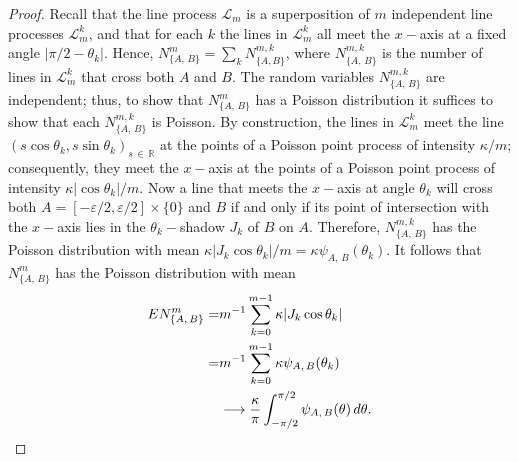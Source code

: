 \documentclass[10pt]{amsart}
\theoremstyle{definition}\newtheorem{defi}[theo]{Definition}\newtheorem{rema}[theo]{Remark}\newtheorem{exam}[theo]{Example}\newtheorem{exem}[theo]{Example}\newtheorem{nota}[theo]{Notation}
\newcommand{\zz}[1]{\mathbb #1}
\begin{document}
\begin{proof}
Recall that the line process $\mathcal{L}_{m}$ is a superposition of $m$ independent line processes $\mathcal{L}^{k}_{m}$, and that for each $k$ the lines in $\mathcal{L}^{k}_{m}$ all meet the $x-$axis at a fixed angle $|\pi /2-\theta_{k}|$. Hence, $N^{m}_{\{A,\,B\}}=\sum_{k}N^{m,k}_{\{A,B\}}$, where $N^{m,k}_{\{A,\,B\}}$ is the number of lines in $\mathcal{L}^{k}_{m}$ that cross both $A$ and $B$. The random variables $N^{m,k}_{\{A,\,B\}}$ are independent; thus, to show that $N^{m}_{\{A,\,B\}}$ has a Poisson distribution it suffices to show that each $N^{m,k}_{\{A,\,B\}}$ is Poisson. By construction, the lines in $\mathcal{L}^{k}_{m}$ meet the line $(s \cos \theta_{k}, s \sin \theta_{k})_{s\,\in\,\zz{R}}$ at the points of a Poisson point process of intensity $\kappa /m$; consequently, they meet the $x-$axis at the points of a Poisson point process of intensity $\kappa |\cos\theta_{k}|/m$. Now a line that meets the $x-$axis at angle $\theta_{k}$ will cross both $A=[-\varepsilon/2,\varepsilon /2]\times \{0 \}$ and $B$ if and only if its point of intersection with the $x-$axis lies in the $\theta_{k}-$shadow $J_{k}$ of $B$ on $A$. Therefore, $N^{m,k}_{\{A,\,B\}}$ has the Poisson distribution with mean $\kappa |J_{k} \cos \theta_{k}|/m=\kappa \psi_{A,\,B} (\theta_{k})$. It follows that $N^{m}_{\{A,\,B\}}$ has the Poisson distribution with mean
\begin{align*}
EN^{m}_{\{A,\,B\}}=&m^{-1}\sum_{k=0}^{m-1} \kappa|J_{k} \cos \theta_{k}|\\
=&m^{-1}\sum_{k=0}^{m-1} \kappa \psi_{A,\,B} (\theta_{k})\\
&\longrightarrow \frac{\kappa }{\pi } \int_{-\pi /2}^{\pi/2}\psi_{A,\,B} (\theta)\,d\theta.\qedhere
\end{align*}
\end{proof}
\end{document}
